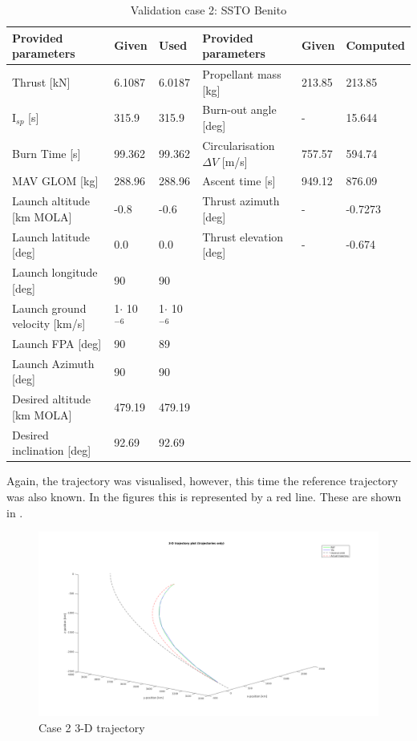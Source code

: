 \begin{table}[!ht]
\begin{center}
\caption{Validation case 2: \ac{SSTO} Benito}
\label{tab:validationCaseBenito}
\begin{tabular}{|l|l|l||l||l|l|}
\hline 
\textbf{Provided parameters} & \textbf{Given} & \textbf{Used} & \textbf{Provided parameters} & \textbf{Given} & \textbf{Computed} \\ \hline \hline
Thrust [kN] & 6.1087 & 6.0187 & Propellant mass [kg] & 213.85 & 213.85 \\ \hline
I$_{sp}$ [s] & 315.9 & 315.9 & Burn-out angle [deg] & - & 15.644 \\ \hline
Burn Time [s] & 99.362 & 99.362 & Circularisation $\Delta V$ [m/s] & 757.57 & 594.74 \\ \hline
\ac{MAV} \ac{GLOM} [kg] & 288.96 & 288.96 & Ascent time [s] & 949.12 & 876.09 \\ \hline
Launch altitude [km \ac{MOLA}] & -0.8 & -0.6 & Thrust azimuth [deg] & - & -0.7273 \\ \hline
Launch latitude [deg] & 0.0 & 0.0 & Thrust elevation [deg] & - & -0.674 \\ \hline
Launch longitude [deg] & 90 & 90 & & & \\ \hline
Launch ground velocity [km/s] & 1$\cdot $ 10$^{-6}$ & 1$\cdot $ 10$^{-6}$ & & & \\ \hline
Launch \ac{FPA} [deg] & 90 & 89 & & & \\ \hline
Launch Azimuth [deg] & 90 & 90 & & & \\ \hline
Desired altitude [km \ac{MOLA}] & 479.19 & 479.19 & & & \\ \hline
Desired inclination [deg] & 92.69 & 92.69 & & & \\ \hline




\end{tabular}
\end{center}
\end{table}

Again, the trajectory was visualised, however, this time the reference trajectory was also known. In the figures this is represented by a red line. These are shown in .



\begin{figure}[!ht]
\centering
\includegraphics[width=0.8 \textwidth]{figures/verification/case2/PlotFigure2Zoom.png}
\caption{Case 2 3-D trajectory}
\label{fig:2PlotFigure2Zoom}
\end{figure}

